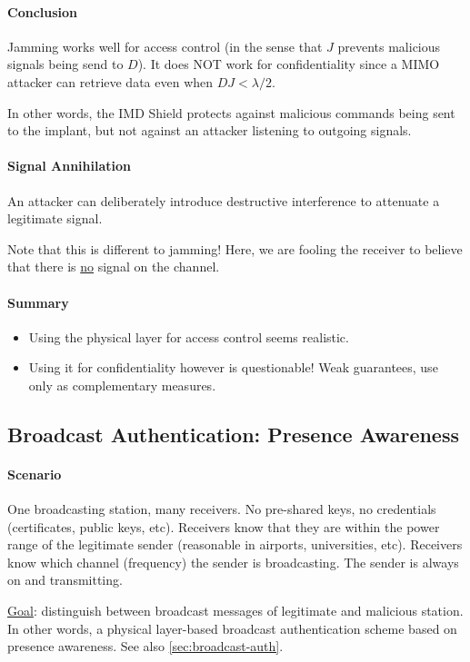 \paragraph{Conclusion}
Jamming works well for access control (in the sense that $J$ prevents malicious signals being send to $D$).
It does NOT work for confidentiality since a MIMO attacker can retrieve data even when $DJ < \lambda/2$.

In other words, the IMD Shield protects against malicious commands being sent to the implant, but not against an attacker listening to outgoing signals.

\paragraph{Signal Annihilation}
An attacker can deliberately introduce destructive interference to attenuate a legitimate signal.

Note that this is different to jamming!
Here, we are fooling the receiver to believe that there is \underline{no} signal on the channel.

\paragraph{Summary}
\begin{itemize}
	\item Using the physical layer for access control seems realistic.
	\item Using it for confidentiality however is questionable!
	Weak guarantees, use only as complementary measures.
\end{itemize}


\subsection{Broadcast Authentication: Presence Awareness}

\paragraph{Scenario}
One broadcasting station, many receivers.
No pre-shared keys, no credentials (certificates, public keys, etc).
Receivers know that they are within the power range of the legitimate sender 
(reasonable in airports, universities, etc).
Receivers know which channel (frequency) the sender is broadcasting.
The sender is always on and transmitting.

\underline{Goal}: distinguish between broadcast messages of legitimate and malicious station.
In other words, a physical layer-based broadcast authentication scheme based on presence awareness.
See also \autoref{sec:broadcast-auth}.

